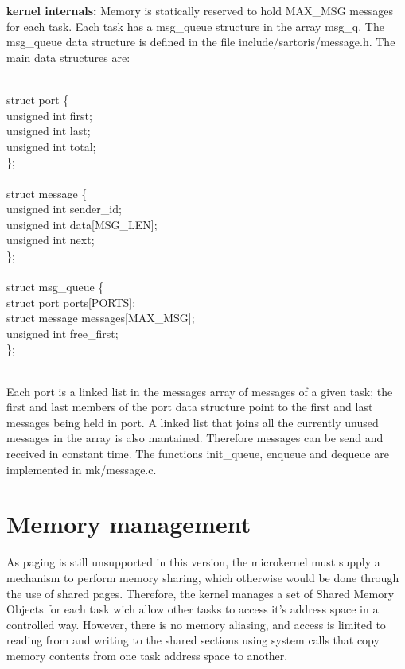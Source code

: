 \documentclass[11pt, letterpaper, twoside, english]{book}
\begin{document}
\textbf{kernel internals:} Memory is statically reserved to hold \textsf{MAX\_MSG} messages for each task. Each task has a \textsf{msg\_queue} structure in the array \textsf{msg\_q}. The \textsf{msg\_queue} data structure is defined in the file \textsf{include/sartoris/message.h}. The main data structures are: \\
\\
\begin{sf} \noindent struct port \{ \\
\indent  unsigned int first; \\ 
\indent  unsigned int last; \\
\indent  unsigned int total; \\
\}; \\
\\
struct message \{ \\
\indent  unsigned int sender\_id; \\
\indent  unsigned int data[MSG\_LEN]; \\
\indent  unsigned int next; \\
\}; \\
\\
struct msg\_queue \{ \\
\indent  struct port ports[PORTS]; \\
\indent  struct message messages[MAX\_MSG]; \\
\indent  unsigned int free\_first; \\
\}; \\
\end{sf}
\\
Each port is a linked list in the \textsf{messages} array of messages of a given task; the \textsf{first} and \textsf{last} members of the \textsf{port} data structure point to the first and last messages being held in \textsf{port}. A linked list that joins all the currently unused messages in the array is also mantained. Therefore messages can be send and received in constant time. The functions \textsf{init\_queue}, \textsf{enqueue} and \textsf{dequeue} are implemented in \textsf{mk/message.c}.

\section{Memory management}
As paging is still unsupported in this version, the microkernel must supply a mechanism to perform memory sharing, which otherwise would be done through the use of shared pages. Therefore, the kernel manages a set of Shared Memory Objects for each task wich allow other tasks to access it's address space in a controlled way. However, there is no memory aliasing, and access is limited to reading from and writing to the shared sections using system calls that copy memory contents from one task address space to another. 
\end{document}
